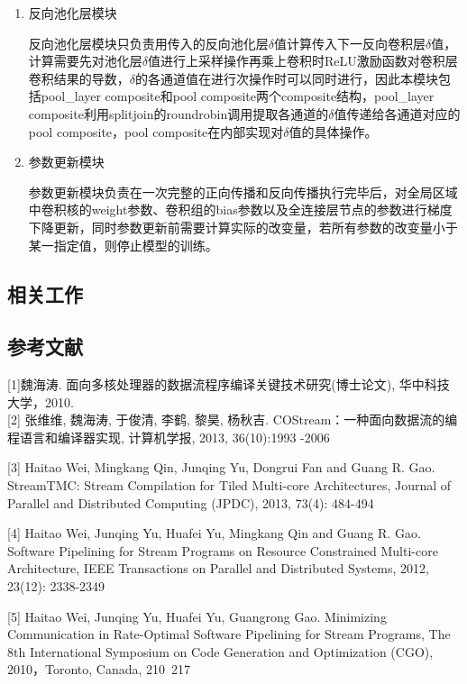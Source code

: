 \begin{enumerate}
\item 反向池化层模块
 
反向池化层模块只负责用传入的反向池化层$\delta$值计算传入下一反向卷积层$\delta$值，计算需要先对池化层$\delta$值进行上采样操作再乘上卷积时ReLU激励函数对卷积层卷积结果的导数，$\delta$的各通道值在进行次操作时可以同时进行，因此本模块包括pool\_layer composite和pool composite两个composite结构，pool\_layer composite利用splitjoin的roundrobin调用提取各通道的$\delta$值传递给各通道对应的pool composite，pool composite在内部实现对$\delta$值的具体操作。

\item 参数更新模块

参数更新模块负责在一次完整的正向传播和反向传播执行完毕后，对全局区域中卷积核的weight参数、卷积组的bias参数以及全连接层节点的参数进行梯度下降更新，同时参数更新前需要计算实际的改变量，若所有参数的改变量小于某一指定值，则停止模型的训练。

\end{enumerate}

\subsection{相关工作}

\subsection{参考文献}
[1]魏海涛. 面向多核处理器的数据流程序编译关键技术研究(博士论文), 华中科技大学，2010.\\

[2] 张维维, 魏海涛, 于俊清, 李鹤, 黎昊, 杨秋吉. COStream：一种面向数据流的编程语言和编译器实现, 计算机学报, 2013, 36(10):1993 -2006

[3] Haitao Wei, Mingkang Qin, Junqing Yu, Dongrui Fan and Guang R. Gao. StreamTMC: Stream Compilation for Tiled Multi-core Architectures, Journal of Parallel and Distributed Computing (JPDC), 2013, 73(4): 484-494

[4] Haitao Wei, Junqing Yu, Huafei Yu, Mingkang Qin and Guang R. Gao. Software Pipelining for Stream Programs on Resource Constrained Multi-core Architecture, IEEE Transactions on Parallel and Distributed Systems, 2012, 23(12): 2338-2349

[5] Haitao Wei, Junqing Yu, Huafei Yu, Guangrong Gao. Minimizing Communication in Rate-Optimal Software Pipelining for Stream Programs, The 8th International Symposium on Code Generation and Optimization (CGO), 2010，Toronto, Canada, 210~217


